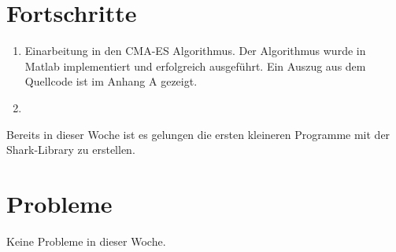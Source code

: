 ﻿\documentclass[a4paper,12pt,fleqn]{scrartcl}
\begin{document}
\section[Fortschritte]{Fortschritte}
\begin{enumerate}
 \item Einarbeitung in den CMA-ES Algorithmus. Der Algorithmus wurde in Matlab
implementiert und erfolgreich ausgeführt. Ein Auszug aus dem Quellcode ist im
{Anhang A} gezeigt.
 \item

\end{enumerate}

Bereits in dieser Woche ist es gelungen die ersten kleineren Programme mit der
Shark-Library zu erstellen.

\section[Probleme]{Probleme}

Keine Probleme in dieser Woche.
\end{document}
